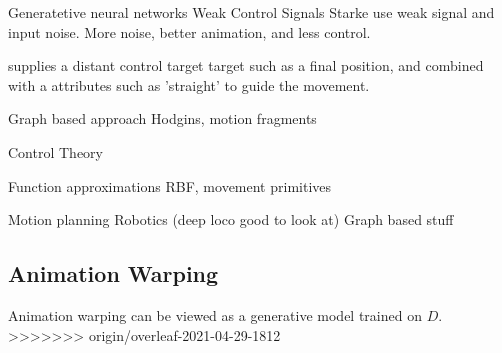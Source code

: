 Generatetive neural networks Weak Control Signals
    Starke use weak signal and input noise. More noise, better animation, and less control.

    \citep{lee18} supplies a distant control target target such as a final position, and combined with a attributes such as 'straight' to guide the movement.

Graph based approach 
    Hodgins, motion fragments

Control Theory

Function approximations 
    RBF, movement primitives

Motion planning
    Robotics (deep loco good to look at)
    Graph based stuff



\subsection{Animation Warping}
Animation warping can be viewed as a generative model trained on $D$. 
>>>>>>> origin/overleaf-2021-04-29-1812

